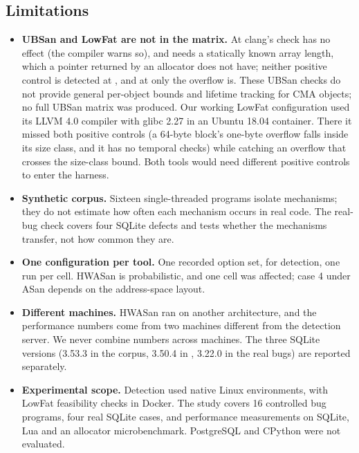 \subsection{Limitations}
\label{sec:limits}

\begin{itemize}
\item \textbf{UBSan and LowFat are not in the matrix.} At  clang's  check has no effect (the compiler warns so), and  needs a statically known array length, which a pointer returned by an allocator does not have; neither positive control is detected at , and at  only the overflow is. These UBSan checks do not provide general per-object bounds and lifetime tracking for CMA objects; no full UBSan matrix was produced. Our working LowFat configuration used its LLVM 4.0 compiler with glibc 2.27 in an Ubuntu 18.04 container. There it missed both positive controls (a 64-byte block's one-byte overflow falls inside its size class, and it has no temporal checks) while catching an overflow that crosses the size-class bound. Both tools would need different positive controls to enter the harness.
\item \textbf{Synthetic corpus.} Sixteen single-threaded programs isolate mechanisms; they do not estimate how often each mechanism occurs in real code. The real-bug check covers four SQLite defects and tests whether the mechanisms transfer, not how common they are.
\item \textbf{One configuration per tool.} One recorded option set,  for detection, one run per cell. HWASan is probabilistic, and one cell was affected; case 4 under ASan depends on the address-space layout.
\item \textbf{Different machines.} HWASan ran on another architecture, and the performance numbers come from two machines different from the detection server. We never combine numbers across machines. The three SQLite versions (3.53.3 in the corpus, 3.50.4 in , 3.22.0 in the real bugs) are reported separately.
\item \textbf{Experimental scope.} Detection used native Linux environments, with LowFat feasibility checks in Docker. The study covers 16 controlled bug programs, four real SQLite cases, and performance measurements on SQLite, Lua and an allocator microbenchmark. PostgreSQL and CPython were not evaluated.
\end{itemize}
